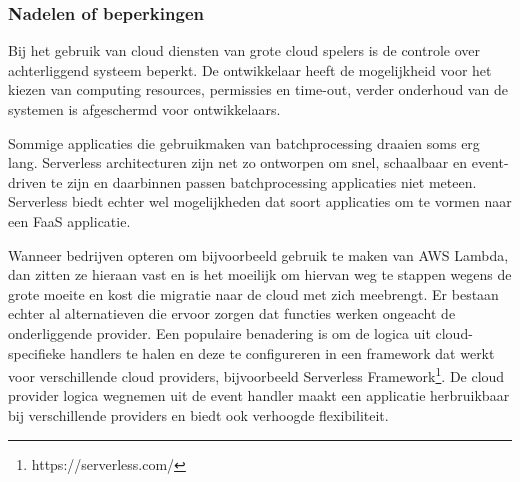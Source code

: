 \subsubsection{Nadelen of beperkingen}
\begin{description}[style=unboxed, labelwidth=\linewidth, listparindent =0pt]
    \item[Geen controle over infrastructuur]
    Bij het gebruik van cloud diensten van grote cloud spelers is de controle over achterliggend systeem beperkt. De ontwikkelaar heeft de mogelijkheid voor het kiezen van computing resources, permissies en time-out, verder onderhoud van de systemen is afgeschermd voor ontwikkelaars.
    \\
    
    \item[Server applicatie die lang draait]
    Sommige applicaties die gebruikmaken van batchprocessing draaien soms erg lang. Serverless architecturen zijn net zo ontworpen om snel, schaalbaar en event-driven te zijn en daarbinnen passen batchprocessing applicaties niet meteen. Serverless biedt echter wel mogelijkheden dat soort applicaties om te vormen naar een FaaS applicatie.
    \\
    
     \item[Vendor lock-in]
     Wanneer bedrijven opteren om bijvoorbeeld gebruik te maken van AWS Lambda, dan zitten ze hieraan vast en is het moeilijk om hiervan weg te stappen wegens de grote moeite en kost die migratie naar de cloud met zich meebrengt. Er bestaan echter al alternatieven die ervoor zorgen dat functies werken ongeacht de onderliggende provider. Een populaire benadering is om de logica uit cloud-specifieke handlers te halen en deze te configureren in een framework dat werkt voor verschillende cloud providers, bijvoorbeeld Serverless Framework\footnote{https://serverless.com/}. De cloud provider logica wegnemen uit de event handler maakt een applicatie herbruikbaar bij verschillende providers en biedt ook verhoogde flexibiliteit.
     \\
     

\end{description}
